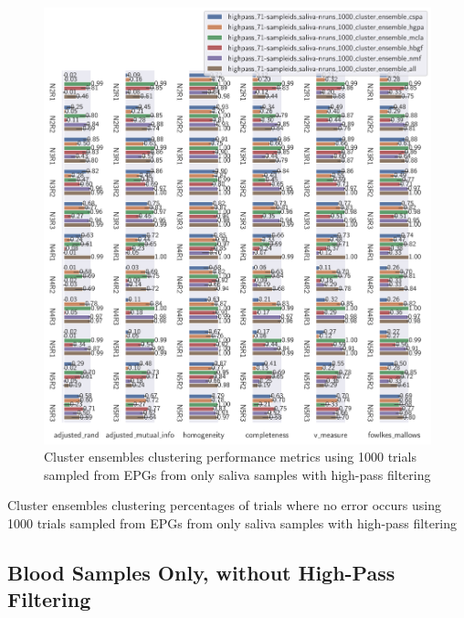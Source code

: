 \begin{theappendices}
\begin{figure}[H]
\centering
\includegraphics[width=\textwidth]{./figures/clust_comparison/highpass_71-sampleids_saliva-nruns_1000_cluster_ensembles.pdf}
\caption{Cluster ensembles clustering performance metrics using 1000 trials sampled from EPGs from only saliva samples with high-pass filtering}
\label{fig:highpass_71-sampleids_saliva-nruns_1000_cluster_ensembles}
\end{figure}

\begin{table}[H]
\centering
{}
\caption{Cluster ensembles clustering percentages of trials where no error occurs using 1000 trials sampled from EPGs from only saliva samples with high-pass filtering}
\label{table:highpass_71-sampleids_saliva-nruns_1000_cluster_ensembles}
\end{table}

\subsection{Blood Samples Only, without High-Pass Filtering}


\end{theappendices}
